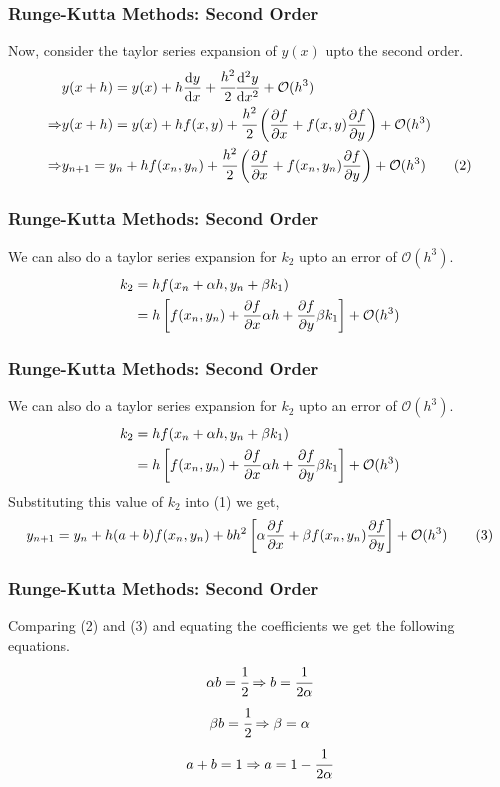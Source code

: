 \documentclass{beamer}
\newcommand{\bigO}{\mathcal{O}}
\begin{document}
\begin{frame}
    \frametitle{Runge-Kutta Methods: Second Order}
    Now, consider the taylor series expansion of $y(x)$ upto the second order.
    \begin{align*}
        &y(x + h) = y(x) + h\dv{y}{x} + \cfrac{h^2}{2} \dv[2]{y}{x} + \bigO(h^3) \\
        \Rightarrow &y(x + h) = y(x) + hf(x, y) + \cfrac{h^2}{2}\left(\pdv{f}{x} + f(x, y)\pdv{f}{y}\right) + \bigO(h^3)\\ 
        \Rightarrow &y_{n+1} = y_n + hf(x_n, y_n) + \cfrac{h^2}{2}\left(\pdv{f}{x} + f(x_n, y_n)\pdv{f}{y}\right) + \bigO(h^3) \tag{2}\\ 
    \end{align*}
\end{frame}
\begin{frame}
    \frametitle{Runge-Kutta Methods: Second Order}
    We can also do a taylor series expansion for $k_2$ upto an error of $\bigO(h^3)$.
    \begin{align*}
        k_2 &= hf(x_n + \alpha h, y_n + \beta k_1) \\ 
            &= h\left[ f(x_n, y_n) + \pdv{f}{x}\alpha h + \pdv{f}{y}\beta k_1 \right] + \bigO(h^3) \\ 
    \end{align*}
\end{frame}
\begin{frame}
    \frametitle{Runge-Kutta Methods: Second Order}
    We can also do a taylor series expansion for $k_2$ upto an error of $\bigO(h^3)$.
    \begin{align*}
        k_2 &= hf(x_n + \alpha h, y_n + \beta k_1) \\ 
            &= h\left[ f(x_n, y_n) + \pdv{f}{x}\alpha h + \pdv{f}{y}\beta k_1 \right] + \bigO(h^3) \\ 
    \end{align*}
    Substituting this value of $k_2$ into (1) we get, 
    \begin{align*}
        y_{n+1} = y_n + h(a + b)f(x_n, y_n) + bh^2\left[ \alpha \pdv{f}{x} + \beta f(x_n, y_n) \pdv{f}{y} \right] + \bigO(h^3) \tag{3}
    \end{align*}
\end{frame}
\begin{frame}
    \frametitle{Runge-Kutta Methods: Second Order}
    Comparing (2) and (3) and equating the coefficients we get the following equations.
    $$\alpha b = \cfrac{1}{2} \Rightarrow b = \cfrac{1}{2\alpha}$$
    $$\beta b = \cfrac{1}{2} \Rightarrow \beta = \alpha$$
    $$a + b = 1 \Rightarrow a = 1 - \cfrac{1}{2\alpha}$$
\end{frame}
\end{document}
